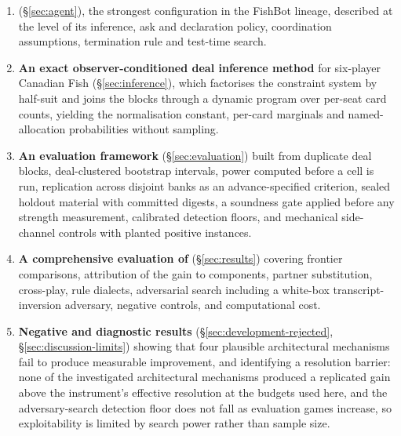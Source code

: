 \begin{enumerate}
\item \textbf{\sestina{}} (\S\ref{sec:agent}), the strongest configuration in the FishBot lineage,
  described at the level of its inference, ask and declaration policy, coordination assumptions,
  termination rule and test-time search.

\item \textbf{An exact observer-conditioned deal inference method} for six-player Canadian Fish
  (\S\ref{sec:inference}), which factorises the constraint system by half-suit and joins the blocks
  through a dynamic program over per-seat card counts, yielding the normalisation constant, per-card
  marginals and named-allocation probabilities without sampling.

\item \textbf{An evaluation framework} (\S\ref{sec:evaluation}) built from duplicate deal blocks,
  deal-clustered bootstrap intervals, power computed before a cell is run, replication across
  disjoint banks as an advance-specified criterion, sealed holdout material with committed digests,
  a soundness gate applied before any strength measurement, calibrated detection floors, and
  mechanical side-channel controls with planted positive instances.

\item \textbf{A comprehensive evaluation of \sestina{}} (\S\ref{sec:results}) covering frontier
  comparisons, attribution of the gain to components, partner substitution, cross-play, rule
  dialects, adversarial search including a white-box transcript-inversion adversary, negative
  controls, and computational cost.

\item \textbf{Negative and diagnostic results} (\S\ref{sec:development-rejected},
  \S\ref{sec:discussion-limits}) showing that four plausible architectural mechanisms fail to produce
  measurable improvement, and identifying a resolution barrier: none of the investigated
  architectural mechanisms produced a replicated gain above the instrument's effective resolution at
  the budgets used here, and the adversary-search detection floor does not fall as evaluation games
  increase, so exploitability is limited by search power rather than sample size.
\end{enumerate}
